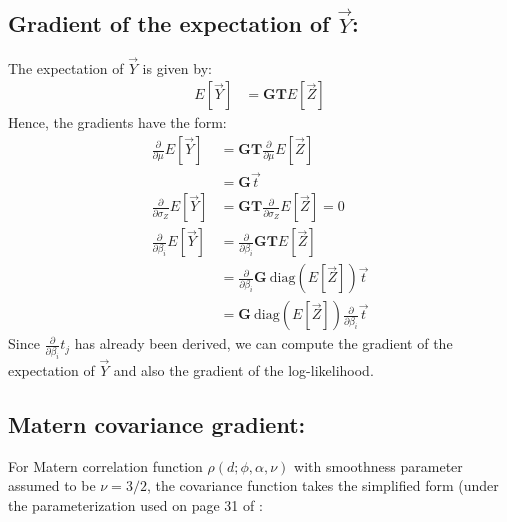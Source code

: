 {\subsection*{Gradient of the expectation of $\vec{Y}$:}
The expectation of $\vec{Y}$ is given by:
\begin{align*}
E[\vec{Y}] &= \mathbf{G T} E[\vec{Z}] 
\end{align*}
Hence, the gradients have the form:
\begin{align*}
\frac{\partial}{\partial \mu} E[\vec{Y}] &= \mathbf{GT} \frac{\partial}{\partial \mu} E[\vec{Z}] \\
&= \mathbf{G} \vec{t} \\
\frac{\partial}{\partial \sigma_{Z}} E[\vec{Y}] &= \mathbf{GT} \frac{\partial}{\partial \sigma_{Z}} E[\vec{Z}] = 0 \\
\frac{\partial}{\partial \beta_i} E[\vec{Y}] &= \frac{\partial}{\partial \beta_i} \mathbf{G T} E[\vec{Z}] \\
&= \frac{\partial}{\partial \beta_i} \mathbf{G} \ \text{diag}(E[\vec{Z}]) \vec{t} \\
&= \mathbf{G} \ \text{diag}(E[\vec{Z}]) \frac{\partial}{\partial \beta_i} \vec{t}
\end{align*}
Since $\frac{\partial}{\partial \beta_i} t_j$ has already been derived, we can compute the gradient of the expectation of $\vec{Y}$ and also the gradient of the log-likelihood.

\subsection*{Matern covariance gradient:}

For Matern correlation function $\rho(d; \phi, \alpha , \nu)$ with smoothness parameter assumed to be $\nu = 3/2$, the covariance function takes the simplified form (under the parameterization used on page 31 of \citet{steinBook}:

}
